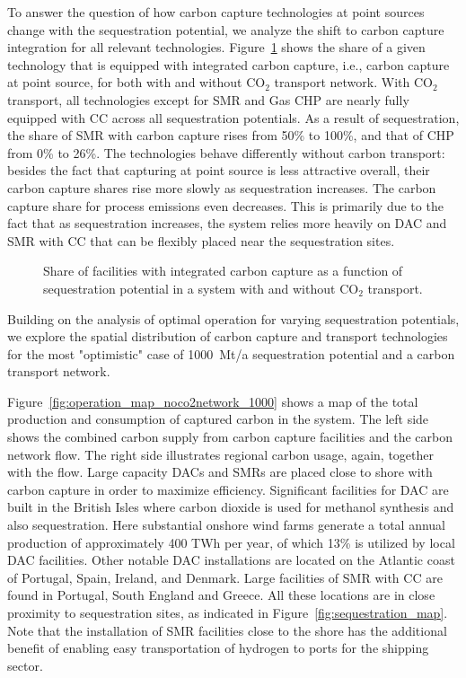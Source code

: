 \documentclass[twocolumn]{article}
\newcommand{\carbon}{CO$_2$}
\begin{document}
To answer the question of how carbon capture technologies at point sources change with the sequestration potential, we analyze the shift to carbon capture integration for all relevant technologies.
Figure~\ref{fig:captureshare_line} shows the share of a given technology that is equipped with integrated carbon capture, i.e., carbon capture at point source, for both with and without \carbon{} transport network.
With \carbon{} transport, all technologies except for SMR and Gas CHP are nearly fully equipped with CC across all sequestration potentials. As a result of sequestration, the share of SMR with carbon capture rises from 50\% to 100\%, and that of CHP from 0\% to 26\%. The technologies behave differently without carbon transport: besides the fact that capturing at point source is less attractive overall, their carbon capture shares rise more slowly as sequestration increases. The carbon capture share for process emissions even decreases. This is primarily due to the fact that as sequestration increases, the system relies more heavily on DAC and SMR with CC that can be flexibly placed near the sequestration sites.

\begin{figure}[h]
    \centering
    \caption{Share of facilities with integrated carbon capture as a function of sequestration potential in a system with and without \carbon{} transport.}
    \label{fig:captureshare_line}
\end{figure}

Building on the analysis of optimal operation for varying sequestration potentials, we explore the spatial distribution of carbon capture and transport technologies for the most "optimistic" case of 1000~Mt/a sequestration potential and a carbon transport network.

Figure~\ref{fig:operation_map_noco2network_1000} shows a map of the total production and consumption of captured carbon in the system. The left side shows the combined carbon supply from carbon capture facilities and the carbon network flow. The right side illustrates regional carbon usage, again, together with the flow. Large capacity DACs and SMRs are placed close to shore with carbon capture in order to maximize efficiency. Significant facilities for DAC are built in the British Isles where carbon dioxide is used for methanol synthesis and also sequestration. Here substantial onshore wind farms generate a total annual production of approximately 400 TWh per year, of which 13\% is utilized by local DAC facilities. Other notable DAC installations are located on the Atlantic coast of Portugal, Spain, Ireland, and Denmark. Large facilities of SMR with CC are found in Portugal, South England and Greece. All these locations are in close proximity to sequestration sites, as indicated in Figure~\ref{fig:sequestration_map}. Note that the installation of SMR facilities close to the shore has the additional benefit of enabling easy transportation of hydrogen to ports for the shipping sector.
\end{document}
